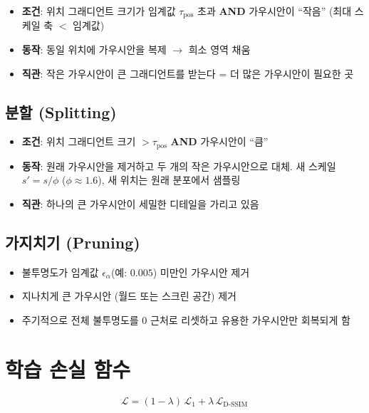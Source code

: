 \documentclass[11pt, a4paper]{report}
\begin{document}
\begin{itemize}[leftmargin=*]
  \item \textbf{조건}: 위치 그래디언트 크기가 임계값 $\tau_{\text{pos}}$ 초과 \textbf{AND} 가우시안이 ``작음'' (최대 스케일 축 $<$ 임계값)
  \item \textbf{동작}: 동일 위치에 가우시안을 복제 $\rightarrow$ 희소 영역 채움
  \item \textbf{직관}: 작은 가우시안이 큰 그래디언트를 받는다 = 더 많은 가우시안이 필요한 곳
\end{itemize}

\subsection{분할 (Splitting)}

\begin{itemize}[leftmargin=*]
  \item \textbf{조건}: 위치 그래디언트 크기 $> \tau_{\text{pos}}$ \textbf{AND} 가우시안이 ``큼''
  \item \textbf{동작}: 원래 가우시안을 제거하고 두 개의 작은 가우시안으로 대체. 새 스케일 $s' = s/\phi$ ($\phi \approx 1.6$), 새 위치는 원래 분포에서 샘플링
  \item \textbf{직관}: 하나의 큰 가우시안이 세밀한 디테일을 가리고 있음
\end{itemize}

\subsection{가지치기 (Pruning)}

\begin{itemize}[leftmargin=*]
  \item 불투명도가 임계값 $\epsilon_\alpha$(예: $0.005$) 미만인 가우시안 제거
  \item 지나치게 큰 가우시안 (월드 또는 스크린 공간) 제거
  \item 주기적으로 전체 불투명도를 0 근처로 리셋하고 유용한 가우시안만 회복되게 함
\end{itemize}


\section{학습 손실 함수}

\begin{equation}
\mathcal{L} = (1 - \lambda)\, \mathcal{L}_1 + \lambda\, \mathcal{L}_{\text{D-SSIM}}
\label{eq:3dgs_loss}
\end{equation}
\end{document}
